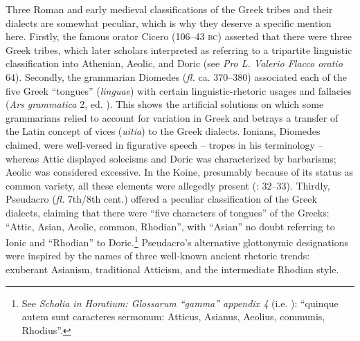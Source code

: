 Three Roman and early medieval classifications of the Greek tribes and their dialects are somewhat peculiar, which is why they deserve a specific mention here. Firstly, the famous orator Cicero (106–43 \textsc{bc}) asserted that there were three Greek tribes, which later scholars interpreted as referring to a tripartite linguistic classification into Athenian, Aeolic, and Doric (see \textit{Pro L. Valerio Flacco oratio} 64). Secondly, the grammarian Diomedes (\textit{fl.} ca. 370–380) associated each of the five Greek “tongues” (\textit{linguae}) with certain linguistic-rhetoric usages and fallacies (\textit{Ars grammatica} 2, ed. \citealt[440]{Keil1857}). This shows the artificial solutions on which some grammarians relied to account for variation in Greek and betrays a transfer of the Latin concept of vices (\textit{uitia}) to the Greek dialects. Ionians, Diomedes claimed, were well-versed in figurative speech – tropes in his terminology – whereas Attic displayed solecisms and Doric was characterized by barbarisms; Aeolic was considered excessive. In the Koine, presumably because of its status as common variety, all these elements were allegedly present (\citealt{Consani1991}: 32–33). Thirdly, Pseudacro (\textit{fl.} 7th/8th cent.) offered a peculiar classification of the Greek dialects, claiming that there were “five characters of tongues” of the Greeks: “Attic, Asian, Aeolic, common, Rhodian”, with “Asian” no doubt referring to Ionic and “Rhodian” to Doric.\footnote{See \textit{Scholia in Horatium: Glossarum “gamma” appendix 4} (i.e. \citealt[385]{Pseudacro1902}): “quinque autem sunt caracteres sermonum: Atticus, Asianus, Aeolius, communis, Rhodius”.} Pseudacro’s alternative glottonymic designations were inspired by the names of three well-known ancient rhetoric trends: exuberant Asianism, traditional Atticism, and the intermediate Rhodian style.

